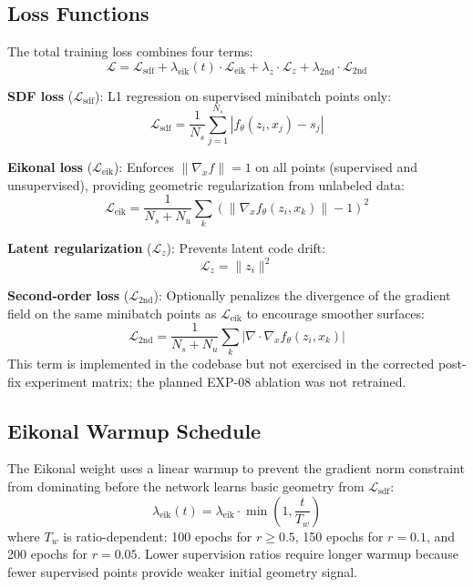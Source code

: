 \documentclass[conference]{IEEEtran}
\begin{document}
\subsection{Loss Functions}

The total training loss combines four terms:
\begin{equation}
    \mathcal{L} = \mathcal{L}_{\text{sdf}} + \lambda_{\text{eik}}(t) \cdot \mathcal{L}_{\text{eik}} + \lambda_z \cdot \mathcal{L}_z + \lambda_{\text{2nd}} \cdot \mathcal{L}_{\text{2nd}}
\end{equation}

\textbf{SDF loss} ($\mathcal{L}_{\text{sdf}}$): L1 regression on supervised minibatch points only:
\begin{equation}
    \mathcal{L}_{\text{sdf}} = \frac{1}{N_s} \sum_{j=1}^{N_s} |f_\theta(z_i, x_j) - s_j|
\end{equation}

\textbf{Eikonal loss} ($\mathcal{L}_{\text{eik}}$): Enforces $\|\nabla_x f\| = 1$ on all points (supervised and unsupervised), providing geometric regularization from unlabeled data:
\begin{equation}
    \mathcal{L}_{\text{eik}} = \frac{1}{N_s + N_u} \sum_{k} \left(\|\nabla_x f_\theta(z_i, x_k)\| - 1\right)^2
\end{equation}

\textbf{Latent regularization} ($\mathcal{L}_z$): Prevents latent code drift:
\begin{equation}
    \mathcal{L}_z = \|z_i\|^2
\end{equation}

\textbf{Second-order loss} ($\mathcal{L}_{\text{2nd}}$): Optionally penalizes the divergence of the gradient field on the same minibatch points as $\mathcal{L}_{\text{eik}}$ to encourage smoother surfaces:
\begin{equation}
    \mathcal{L}_{\text{2nd}} = \frac{1}{N_s + N_u} \sum_k |\nabla \cdot \nabla_x f_\theta(z_i, x_k)|
\end{equation}
This term is implemented in the codebase but not exercised in the corrected
post-fix experiment matrix; the planned EXP-08 ablation was not retrained.

\subsection{Eikonal Warmup Schedule}

The Eikonal weight uses a linear warmup to prevent the gradient norm constraint from dominating before the network learns basic geometry from $\mathcal{L}_{\text{sdf}}$:
\begin{equation}
    \lambda_{\text{eik}}(t) = \lambda_{\text{eik}} \cdot \min\left(1, \frac{t}{T_w}\right)
\end{equation}
where $T_w$ is ratio-dependent: 100 epochs for $r \geq 0.5$, 150 epochs for $r = 0.1$, and 200 epochs for $r = 0.05$. Lower supervision ratios require longer warmup because fewer supervised points provide weaker initial geometry signal.
\end{document}
